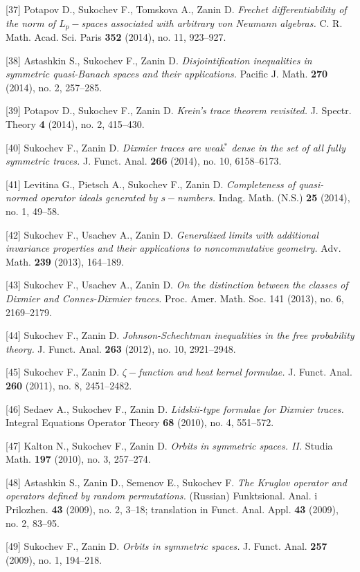 \documentclass{article}
\begin{document}
[37] Potapov D., Sukochev F., Tomskova A., Zanin D. {\it Frechet differentiability of the norm of $L_p-$spaces associated with arbitrary von Neumann algebras.} C. R. Math. Acad. Sci. Paris {\bf 352} (2014), no. 11, 923--927.

[38] Astashkin S., Sukochev F., Zanin D. {\it Disjointification inequalities in symmetric quasi-Banach spaces and their applications.} Pacific J. Math. {\bf 270} (2014), no. 2, 257--285.

[39] Potapov D., Sukochev F., Zanin D. {\it Krein's trace theorem revisited.} J. Spectr. Theory {\bf 4} (2014), no. 2, 415--430.

[40] Sukochev F., Zanin D. {\it Dixmier traces are weak$^*$ dense in the set of all fully symmetric traces.} J. Funct. Anal. {\bf 266} (2014), no. 10, 6158--6173.

[41] Levitina G., Pietsch A., Sukochev F., Zanin D. {\it Completeness of quasi-normed operator ideals generated by $s-$numbers.} Indag. Math. (N.S.) {\bf 25} (2014), no. 1, 49--58.

[42] Sukochev F., Usachev A., Zanin D. {\it Generalized limits with additional invariance properties and their applications to noncommutative geometry.} Adv. Math. {\bf 239} (2013), 164--189.

[43] Sukochev F., Usachev A., Zanin D. {\it On the distinction between the classes of Dixmier and Connes-Dixmier traces.} Proc. Amer. Math. Soc. 141 (2013), no. 6, 2169--2179.

[44] Sukochev F., Zanin D. {\it Johnson-Schechtman inequalities in the free probability theory.} J. Funct. Anal. {\bf 263} (2012), no. 10, 2921--2948.

[45] Sukochev F., Zanin D. {\it $\zeta-$function and heat kernel formulae.} J. Funct. Anal. {\bf 260} (2011), no. 8, 2451--2482.

[46] Sedaev A., Sukochev F., Zanin D. {\it Lidskii-type formulae for Dixmier traces.} Integral Equations Operator Theory {\bf 68} (2010), no. 4, 551--572.

[47] Kalton N., Sukochev F., Zanin D. {\it Orbits in symmetric spaces. II.} Studia Math. {\bf 197} (2010), no. 3, 257--274.

[48] Astashkin S., Zanin D., Semenov E., Sukochev F. {\it The Kruglov operator and operators defined by random permutations.} (Russian) Funktsional. Anal. i Prilozhen. {\bf 43} (2009), no. 2, 3--18; translation in Funct. Anal. Appl. {\bf 43} (2009), no. 2, 83--95.

[49] Sukochev F., Zanin D. {\it Orbits in symmetric spaces.} J. Funct. Anal. {\bf 257} (2009), no. 1, 194--218.
\end{document}
